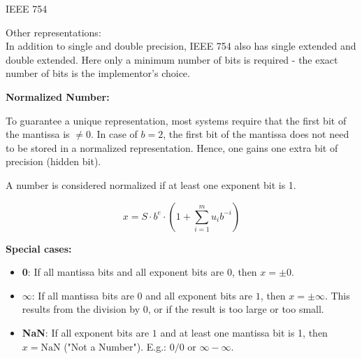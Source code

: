 \begin{vbframe}{IEEE 754}

\lz

Other representations:\\
In addition to single and double precision, IEEE 754 also has single extended and double extended. Here only a minimum number of bits is required - the exact number of bits is the implementor's choice.

\framebreak
\textbf{Normalized Number:}

To guarantee a unique representation, most systems require
that the first bit of the mantissa is $\neq 0$.
In case of $b=2$, the first bit of the mantissa does not need to be stored in a normalized representation.
Hence, one gains one extra bit of precision (hidden bit).

\lz
A number is considered normalized if at least one exponent bit is 1.

$$
x = S \cdot b^e \cdot (1 + \sum_{i=1}^m u_{i} b^{-i}) %
$$


\framebreak
\textbf{Special cases:}
\begin{itemize}
\item \textbf{0}: If all mantissa bits and all exponent bits are $0$, then $x = \pm 0$.
\item $\boldsymbol{\infty}$: If all mantissa bits are $0$ and all exponent bits are $1$, then $x = \pm\infty$. This results from the division by $0$, or if the result is too large or too small.
\item \textbf{NaN}:  If all exponent bits are $1$ and at least one mantissa bit is 1, then $x = \text{NaN}$ ("Not a Number"). E.g.: $0 / 0$ or $\infty - \infty$.
\end{itemize}


\end{vbframe}
